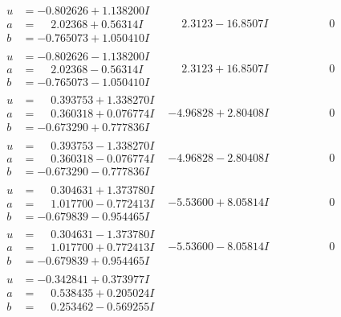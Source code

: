 \documentclass[1p]{elsarticle_modified}
\theoremstyle{definition}
\begin{document}
$$\begin{array}{c|c|c}
\begin{aligned}
u &= -0.802626 + 1.138200 I \\
a &= \phantom{-}2.02368 + 0.56314 I \\
b &= -0.765073 + 1.050410 I\end{aligned}
 & \phantom{-}2.3123 - 16.8507 I & \phantom{-0.000000 } 0 \\ \hline\begin{aligned}
u &= -0.802626 - 1.138200 I \\
a &= \phantom{-}2.02368 - 0.56314 I \\
b &= -0.765073 - 1.050410 I\end{aligned}
 & \phantom{-}2.3123 + 16.8507 I & \phantom{-0.000000 } 0 \\ \hline\begin{aligned}
u &= \phantom{-}0.393753 + 1.338270 I \\
a &= \phantom{-}0.360318 + 0.076774 I \\
b &= -0.673290 + 0.777836 I\end{aligned}
 & -4.96828 + 2.80408 I & \phantom{-0.000000 } 0 \\ \hline\begin{aligned}
u &= \phantom{-}0.393753 - 1.338270 I \\
a &= \phantom{-}0.360318 - 0.076774 I \\
b &= -0.673290 - 0.777836 I\end{aligned}
 & -4.96828 - 2.80408 I & \phantom{-0.000000 } 0 \\ \hline\begin{aligned}
u &= \phantom{-}0.304631 + 1.373780 I \\
a &= \phantom{-}1.017700 - 0.772413 I \\
b &= -0.679839 - 0.954465 I\end{aligned}
 & -5.53600 + 8.05814 I & \phantom{-0.000000 } 0 \\ \hline\begin{aligned}
u &= \phantom{-}0.304631 - 1.373780 I \\
a &= \phantom{-}1.017700 + 0.772413 I \\
b &= -0.679839 + 0.954465 I\end{aligned}
 & -5.53600 - 8.05814 I & \phantom{-0.000000 } 0 \\ \hline\begin{aligned}
u &= -0.342841 + 0.373977 I \\
a &= \phantom{-}0.538435 + 0.205024 I \\
b &= \phantom{-}0.253462 - 0.569255 I\end{aligned}

\end{array}$$
\end{document}

